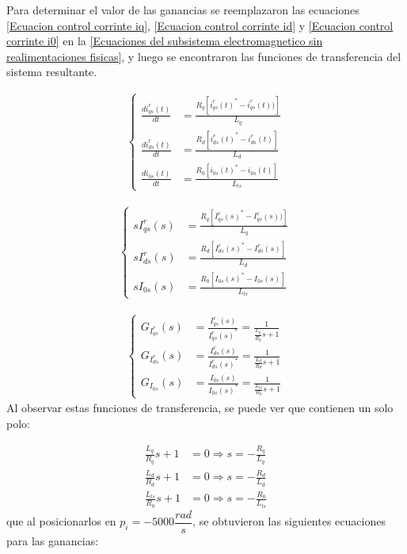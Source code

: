 \documentclass[a4paper, 10pt, onecolumn,journal]{ieeeconf}
\begin{document}
Para determinar el valor de las ganancias se reemplazaron las ecuaciones \eqref{Ecuacion control corrinte iq}, \eqref{Ecuacion control corrinte id} y \eqref{Ecuacion control corrinte i0} en la \cref{Ecuaciones del subsistema electromagnetico sin realimentaciones fisicas}, y luego se encontraron las funciones de transferencia del sistema resultante.

\begin{align}
	\begin{cases}
		\frac{d i^r_{qs}(t)}{dt} &= \frac{ R_q \left[ {i^r_{qs}(t)}^* - i^r_{qs}(t))\right]}{L_q}\\
		\frac{d i^r_{ds}(t)}{dt} &= \frac{R_d \left[ {i^r_{ds}(t)}^* - i^r_{ds}(t) \right]}{L_d} \\ 
		\frac{d i_{0s}(t)}{dt}   &= \frac{R_0 \left[ {i_{0s}(t)}^* - i_{0s}(t) \right]}{L_{ls}}
	\end{cases}	\label{Ecuaciones lazos de control de corriente}
\end{align}

\begin{align}
	\begin{cases}
		s{I}^r_{qs}(s) &= \frac{ R_q \left[ {I^r_{qs}(s)}^* - I^r_{qs}(s))\right]}{L_q}\\
		s{I}^r_{ds}(s) &= \frac{R_d \left[ {I^r_{ds}(s)}^* - I^r_{ds}(s) \right]}{L_d} \\ 
		s{I}_{0s}(s)   &= \frac{R_0 \left[ {I_{0s}(s)}^* - I_{0s}(s) \right]}{L_{ls}}
	\end{cases}	\label{Ecuaciones Laplace lazos de control de corriente}
\end{align}

\begin{align}
	\begin{cases}
		G_{{I}^r_{qs}}(s) &=\frac{{I}^r_{qs}(s)}{{I^r_{qs}(s)}^*} =\frac{1}{\frac{L_q}{R_q} s + 1}\\
		G_{{I}^r_{ds}}(s) &=\frac{{I}^r_{ds}(s)}{{I^r_{ds}(s)}^*} = \frac{1}{\frac{L_d}{R_d} s + 1}\\ 
		G_{{I}_{0s}}(s)   &=\frac{{I}_{0s}(s)}{{I_{0s}(s)}^*} = \frac{1}{\frac{L_{ls}}{R_0} s + 1}
	\end{cases}	\label{Funciones de Transferencia de lazos de control de corriente}
\end{align}
Al observar estas funciones de transferencia, se puede ver que contienen un solo polo:

\begin{align}
	\frac{L_q}{R_q} s + 1 &= 0 \Rightarrow s = -\frac{R_q}{L_q}\\
	\frac{L_{d}}{R_d} s + 1 &=0 \Rightarrow s = -\frac{R_d}{L_d}\\ 
	\frac{L_{ls}}{R_0} s + 1  &=0 \Rightarrow s = -\frac{R_0}{L_{ls}}
\end{align}
que al posicionarlos en $p_{i}=-5000\dfrac{rad}{s}$, se obtuvieron las siguientes ecuaciones para las ganancias:
\end{document}

